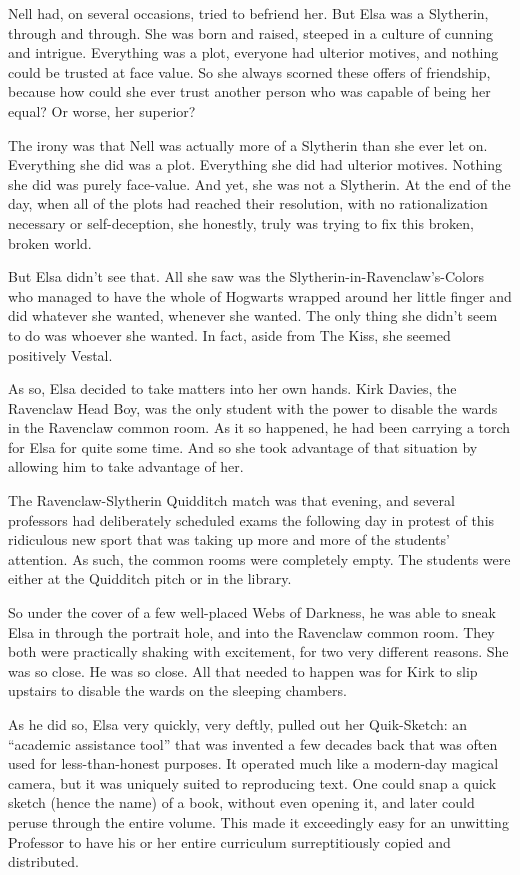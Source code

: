 Nell had, on several occasions, tried to befriend her. But Elsa was a Slytherin, through and through. She was born and raised, steeped in a culture of cunning and intrigue. Everything was a plot, everyone had ulterior motives, and nothing could be trusted at face value. So she always scorned these offers of friendship, because how could she ever trust another person who was capable of being her equal? Or worse, her superior?

The irony was that Nell was actually more of a Slytherin than she ever let on. Everything she did was a plot. Everything she did had ulterior motives. Nothing she did was purely face-value. And yet, she was not a Slytherin. At the end of the day, when all of the plots had reached their resolution, with no rationalization necessary or self-deception, she honestly, truly was trying to fix this broken, broken world.

But Elsa didn’t see that. All she saw was the Slytherin-in-Ravenclaw’s-Colors who managed to have the whole of Hogwarts wrapped around her little finger and did whatever she wanted, whenever she wanted. The only thing she didn’t seem to do was whoever she wanted. In fact, aside from The Kiss, she seemed positively Vestal.

As so, Elsa decided to take matters into her own hands. Kirk Davies, the Ravenclaw Head Boy, was the only student with the power to disable the wards in the Ravenclaw common room. As it so happened, he had been carrying a torch for Elsa for quite some time. And so she took advantage of that situation by allowing him to take advantage of her.

The Ravenclaw-Slytherin Quidditch match was that evening, and several professors had deliberately scheduled exams the following day in protest of this ridiculous new sport that was taking up more and more of the students’ attention. As such, the common rooms were completely empty. The students were either at the Quidditch pitch or in the library.

So under the cover of a few well-placed Webs of Darkness, he was able to sneak Elsa in through the portrait hole, and into the Ravenclaw common room. They both were practically shaking with excitement, for two very different reasons. She was so close. He was so close. All that needed to happen was for Kirk to slip upstairs to disable the wards on the sleeping chambers.

As he did so, Elsa very quickly, very deftly, pulled out her Quik-Sketch: an “academic assistance tool” that was invented a few decades back that was often used for less-than-honest purposes. It operated much like a modern-day magical camera, but it was uniquely suited to reproducing text. One could snap a quick sketch (hence the name) of a book, without even opening it, and later could peruse through the entire volume. This made it exceedingly easy for an unwitting Professor to have his or her entire curriculum surreptitiously copied and distributed.

